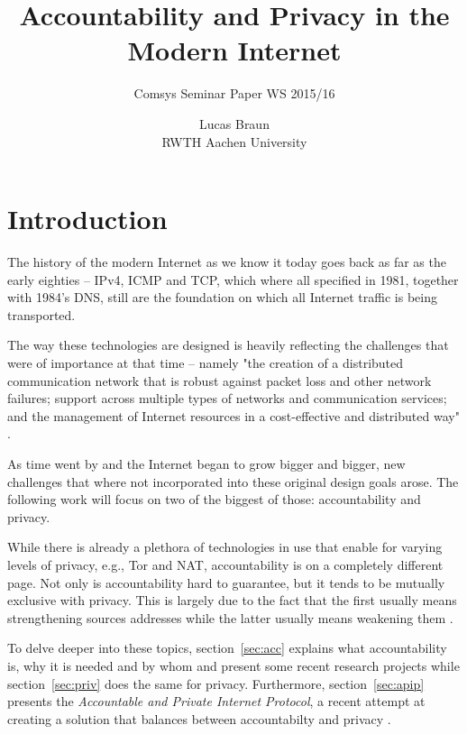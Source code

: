 \documentclass{acm_proc_article-sp}
\begin{document}
\title{Accountability and Privacy in the Modern Internet}
\subtitle{Comsys Seminar Paper WS 2015/16}

\author{
\alignauthor
Lucas Braun\\
	RWTH Aachen University \\
}

\maketitle
\begin{abstract}
\end{abstract}

\section{Introduction}
The history of the modern Internet as we know it today goes back as far as the early eighties -- IPv4, ICMP and TCP, which where all specified in 1981, together with 1984's DNS, still are the foundation on which all Internet traffic is being transported.

The way these technologies are designed is heavily reflecting the challenges that were of importance at that time -- namely "the creation of a distributed communication network that is robust against packet loss and other network failures; support across multiple types of networks and communication services; and the management of Internet resources in a cost-effective and distributed way" \cite{mot}.

As time went by and the Internet began to grow bigger and bigger, new challenges that where not incorporated into these original design goals arose. The following work will focus on two of the biggest of those: accountability and privacy.

While there is already a plethora of technologies in use that enable for varying levels of privacy, e.g., Tor and NAT, accountability is on a completely different page. Not only is accountability hard to guarantee, but it tends to be mutually exclusive with privacy. This is largely due to the fact that the first usually means strengthening sources addresses while the latter usually means weakening them \cite{apip}.

To delve deeper into these topics, section~\ref{sec:acc} explains what accountability is, why it is needed and by whom and present some recent research projects while section~\ref{sec:priv} does the same for privacy. Furthermore, section~\ref{sec:apip} presents the \emph{Accountable and Private Internet Protocol}, a recent attempt at creating a solution that balances between accountabilty and privacy \cite{apip}.
\end{document}
